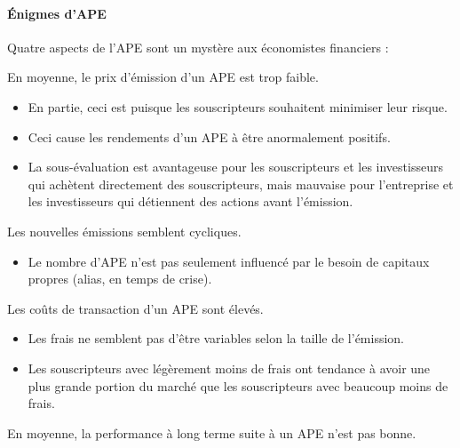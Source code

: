 \documentclass[10pt, french]{article}
\begin{document}
\begin{multicols*}{2}
\paragraph{Énigmes d'APE}
Quatre aspects de l'APE sont un mystère aux économistes financiers :

\begin{definitionNOHFILLpropos}
En moyenne, le prix d'émission d'un APE est trop faible.

\begin{itemize}
	\item	En partie, ceci est puisque les souscripteurs souhaitent minimiser leur risque.
	\item	Ceci cause les rendements d'un APE à être anormalement positifs.
	\item	La sous-évaluation est avantageuse pour les souscripteurs et les investisseurs qui achètent directement des souscripteurs, mais mauvaise pour l'entreprise et les investisseurs qui détiennent des actions avant l'émission.
\end{itemize}
\end{definitionNOHFILLpropos}

\begin{definitionNOHFILLpropos}[Cycles]
Les nouvelles émissions semblent cycliques.
\begin{itemize}
	\item	Le nombre d'APE n'est pas seulement influencé par le besoin de capitaux propres (alias, en temps de crise).
\end{itemize}
\end{definitionNOHFILLpropos}

\begin{definitionNOHFILLpropos}
Les coûts de transaction d'un APE sont élevés.
\begin{itemize}
	\item	Les frais ne semblent pas d'être variables selon la taille de l'émission.
	\item	Les souscripteurs avec légèrement moins de frais ont tendance à avoir une plus grande portion du marché que les souscripteurs avec beaucoup moins de frais.
\end{itemize}
\end{definitionNOHFILLpropos}

\begin{definitionNOHFILLpropos}
En moyenne, la performance à long terme suite à un APE n'est pas bonne.
\end{definitionNOHFILLpropos}



\end{multicols*}
\end{document}
